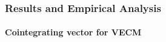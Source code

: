 \documentclass[12pt]{beamer}
\begin{document}
\begin{frame}
	
	
	\frametitle{Results and Empirical Analysis}
	\framesubtitle{ Cointegrating vector for VECM }
	
	\begin{table}[h]
		\centering
		\caption{Cointegrating vector for VECM }
		\label{tab:summary-stats}
	\end{table}
	
\end{frame}




	
	
\end{document}
